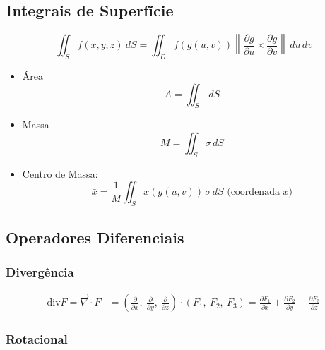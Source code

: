 \documentclass[11pt, a4paper]{article}
\begin{document}
\subsection{Integrais de Superfície}

\begin{equation*}
    \iint_S f(x, y, z) \ dS = \iint_D f(g(u, v))
    \left\lVert
    \frac{\partial g}{\partial u} \times
    \frac{\partial g}{\partial v}
    \right\rVert \, du\,dv
\end{equation*}

\begin{itemize}
    \item Área
          \begin{equation*}
              A = \iint_S \, dS
          \end{equation*}
    \item Massa
          \begin{equation*}
              M = \iint_S \sigma \, dS
          \end{equation*}
    \item Centro de Massa:
          \begin{equation*}
              \bar{x} = \frac{1}{M} \iint_S x(g(u, v)) \, \sigma \, dS
              \text{ \ \ \ \ \  (coordenada $x$)}
          \end{equation*}
\end{itemize}

\subsection{Operadores Diferenciais}

\subsubsection{Divergência}

\begin{align*}
    \text{div} F = \vec{\nabla} \cdot F & = \left(\frac{\partial}{\partial x}
    ,\ \frac{\partial}{\partial y}
    ,\ \frac{\partial}{\partial z}\right)
    \cdot (F_1,\ F_2,\ F_3)
    = \frac{\partial F_1}{\partial x}
    + \frac{\partial F_2}{\partial y}
    + \frac{\partial F_3}{\partial z}
\end{align*}

\subsubsection{Rotacional}
\end{document}
